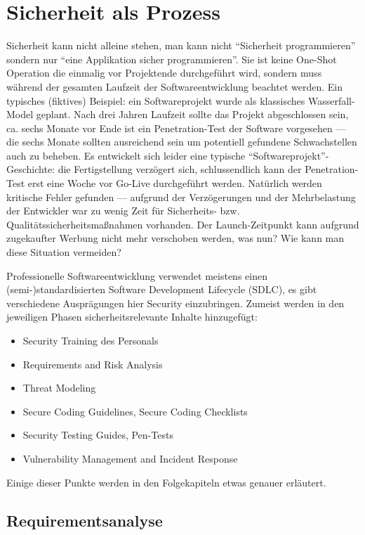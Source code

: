 \chapter{Sicherheit als Prozess}

Sicherheit kann nicht alleine stehen, man kann nicht ``Sicherheit programmieren'' sondern nur ``eine Applikation sicher programmieren''. Sie ist keine One-Shot Operation die einmalig vor Projektende durchgeführt wird, sondern muss während der gesamten Laufzeit der Softwareentwicklung beachtet werden. Ein typisches (fiktives) Beispiel: ein Softwareprojekt wurde als klassisches Wasserfall-Model geplant. Nach drei Jahren Laufzeit sollte das Projekt abgeschlossen sein, ca. sechs Monate vor Ende ist ein Penetration-Test der Software vorgesehen --- die sechs Monate sollten ausreichend sein um potentiell gefundene Schwachstellen auch zu beheben. Es entwickelt sich leider eine typische ``Softwareprojekt''-Geschichte: die Fertigstellung verzögert sich, schlussendlich kann der Penetration-Test erst eine Woche vor Go-Live durchgeführt werden. Natürlich werden kritische Fehler gefunden --- aufgrund der Verzögerungen und der Mehrbelastung der Entwickler war zu wenig Zeit für Sicherheits- bzw. Qualitätssicherheitsmaßnahmen vorhanden. Der Launch-Zeitpunkt kann aufgrund zugekaufter Werbung nicht mehr verschoben werden, was nun? Wie kann man diese Situation vermeiden?

Professionelle Softwareentwicklung verwendet meistens einen (semi-)standardisierten Software Development Lifecycle (SDLC), es gibt verschiedene Ausprägungen hier Security einzubringen. Zumeist werden in den jeweiligen Phasen sicherheitsrelevante Inhalte hinzugefügt:

\begin{itemize}
	\item Security Training des Personals
	\item Requirements and Risk Analysis
	\item Threat Modeling
	\item Secure Coding Guidelines, Secure Coding Checklists
	\item Security Testing Guides, Pen-Tests
	\item Vulnerability Management and Incident Response
\end{itemize}

Einige dieser Punkte werden in den Folgekapiteln etwas genauer erläutert.

\section{Requirementsanalyse}

